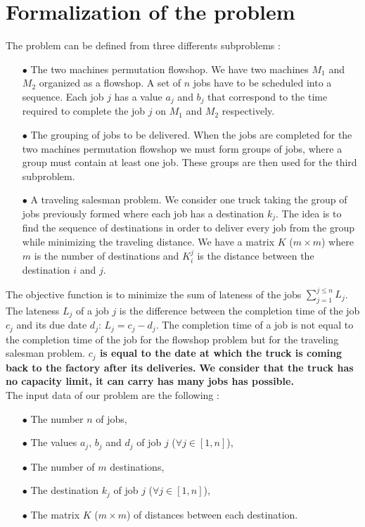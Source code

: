 \documentclass[UTF8, twoside]{EPURapport}
\begin{document}
\chapter{Formalization of the problem}

	The problem can be defined from three differents subproblems :
	
\begin{itemize}
\item[$\bullet$] The two machines permutation flowshop. We have two machines $M_1$ and $M_2$ organized as a flowshop. A set of $n$ jobs have to be scheduled into a sequence. Each job $j$ has a value $a_j$ and $b_j$ that correspond to the time required to complete the job $j$ on $M_1$ and $M_2$ respectively.
\item[$\bullet$] The grouping of jobs to be delivered. When the jobs are completed for the two machines permutation flowshop we must form groups of jobs, where a group must contain at least one job. These groups are then used for the third subproblem.
\item[$\bullet$] A traveling salesman problem. We consider one truck taking the group of jobs previously formed where each job has a destination $k_j$. The idea is to find the sequence of destinations in order to deliver every job from the group while minimizing the traveling distance. We have a matrix $K$ ($m \times m$) where $m$ is the number of destinations and $K_i^j$ is the distance between the destination $i$ and $j$.
\end{itemize}

	The objective function is to minimize the sum of lateness of the jobs $\sum_{j=1}^{j \leq n} L_j$. The lateness $L_j$  of a job $j$ is the difference between the completion time of the job $c_j$ and its due date $d_j$: $L_j = c_j - d_j$. The completion time of a job is not equal to the completion time of the job for the flowshop problem but for the traveling salesman problem. \textbf{$c_j$ is equal to the date at which the truck is coming back to the factory after its deliveries.}
\textbf{We consider that the truck has no capacity limit, it can carry has many jobs has possible.}
\\

	The input data of our problem are the following :
\begin{itemize}
\item[$\bullet$] The number $n$ of jobs,
\item[$\bullet$] The values $a_j$, $b_j$ and $d_j$ of job $j$ ($\forall j \in [1,n]$),
\item[$\bullet$] The number of $m$ destinations,
\item[$\bullet$] The destination $k_j$ of job $j$ ($\forall j \in [1,n]$),
\item[$\bullet$] The matrix $K$ ($m \times m$) of distances between each destination.\\
\end{itemize}
\end{document}
